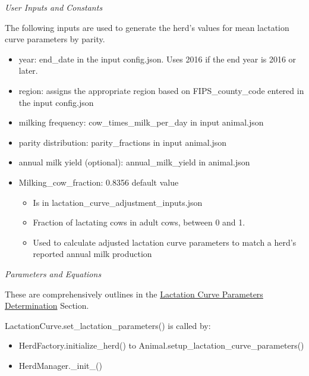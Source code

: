\documentclass{article}
\begin{document}
\begin{refsection}
\begin{enumerate}
         \textit{User Inputs and Constants}
         \vspace{0.1cm}

         The following inputs are used to generate the herd’s values for mean lactation curve parameters by parity. 
            
         \begin{itemize}
             \item year: end\_date in the input config.json. Uses 2016 if the end year is 2016 or later.  
             \item region: assigns the appropriate region based on FIPS\_county\_code entered in the input config.json  
             \item milking frequency: cow\_times\_milk\_per\_day in input animal.json 
             \item parity distribution: parity\_fractions in input animal.json 
             \item annual milk yield (optional): annual\_milk\_yield in animal.json 
             \item Milking\_cow\_fraction: 0.8356 default value 
             \begin{itemize}
                 \item Is in lactation\_curve\_adjustment\_inputs.json 
                 \item Fraction of lactating cows in adult cows, between 0 and 1. 
                 \item Used to calculate adjusted lactation curve parameters to match a herd’s reported annual milk production 
             \end{itemize}
         \end{itemize}
         
         \textit{Parameters and Equations}
         \vspace{0.1cm}

         These are comprehensively outlines in the \hyperref[lactcurve]{Lactation Curve Parameters Determination} Section.
        \vspace{0.1cm}
        
         LactationCurve.set\_lactation\_parameters() is called by:
         \begin{itemize}
             \item HerdFactory.initialize\_herd() to Animal.setup\_lactation\_curve\_parameters() 
             \item HerdManager.\_init\_() 

         \end{itemize}
        \vspace{0.2cm}
        

\end{enumerate}
\end{refsection}
\end{document}
